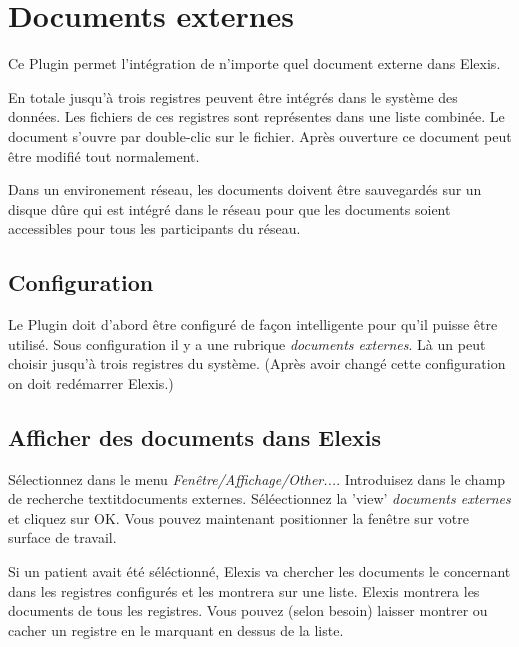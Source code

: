 
\section{Documents externes}\label{elexis-externedokumente}
Ce Plugin permet l'intégration de n'importe quel document externe dans Elexis.

En totale jusqu'à trois registres peuvent être intégrés dans le système des données.
Les fichiers de ces registres sont représentes dans une liste combinée.
Le document s'ouvre par double-clic sur le fichier.
Après ouverture ce document peut être modifié tout normalement.

Dans un environement réseau, les documents doivent être sauvegardés sur un disque dûre qui est intégré dans le réseau pour que les documents soient accessibles pour tous les participants du réseau.

\subsection{Configuration}

Le Plugin doit d'abord être configuré de façon intelligente pour qu'il puisse être utilisé.
Sous configuration il y a une rubrique \textit{documents externes}.
Là un peut choisir jusqu'à trois registres du système. 
(Après avoir changé cette configuration on doit redémarrer Elexis.)

\subsection{Afficher des documents dans Elexis}

Sélectionnez dans le menu \textit{Fenêtre/Affichage/Other...}. Introduisez dans le champ de recherche textit{documents externes}. Séléectionnez la 'view' \textit{documents externes} et cliquez sur OK.
Vous pouvez maintenant positionner la fenêtre sur votre surface de travail.

Si un patient avait été séléctionné, Elexis va chercher les documents le concernant dans les registres configurés et les montrera sur une liste. Elexis montrera les documents de tous les registres. Vous pouvez (selon besoin) laisser montrer ou cacher un registre en le marquant en dessus de la liste.


